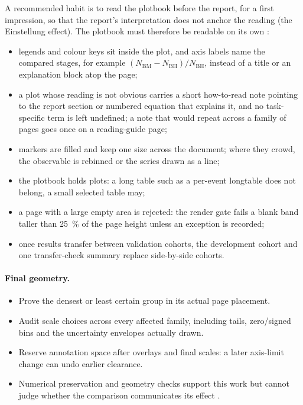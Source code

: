 A recommended habit is to read the plotbook before the report, for a first impression, so
that the report's interpretation does not anchor the reading (the Einstellung effect).
The plotbook must therefore be readable on its own \cite[What a plotbook holds;
  Established appearance]{skill:plot-production}:
\begin{itemize}
  \item legends and colour keys sit inside the plot, and axis labels name the compared stages,
        for example $(N_\mathrm{BM}-N_\mathrm{BH})/N_\mathrm{BH}$, instead of a title or an
        explanation block atop the page;
  \item a plot whose reading is not obvious carries a short how-to-read note pointing to the
        report section or numbered equation that explains it, and no task-specific term is left
        undefined; a note that would repeat across a family of pages goes once on a reading-guide
        page;
  \item markers are filled and keep one size across the document; where they crowd, the
        observable is rebinned or the series drawn as a line;
  \item the plotbook holds plots: a long table such as a per-event longtable does not belong, a
        small selected table may;
  \item a page with a large empty area is rejected: the render gate fails a blank band taller
        than \SI{25}{\percent} of the page height unless an exception is recorded;
  \item once results transfer between validation cohorts, the development cohort and one
        transfer-check summary replace side-by-side cohorts.
\end{itemize}

\paragraph{Final geometry.}
\begin{itemize}
  \item Prove the densest or least certain group in its actual page placement.
  \item Audit scale choices across every affected family, including tails, zero/signed bins and
        the uncertainty envelopes actually drawn.
  \item Reserve annotation space after overlays and final scales: a later axis-limit change can
        undo earlier clearance.
  \item Numerical preservation and geometry checks support this work but cannot judge whether the
        comparison communicates its effect \cite[Scales and final geometry; Render and
          accept]{skill:plot-production}.
\end{itemize}

